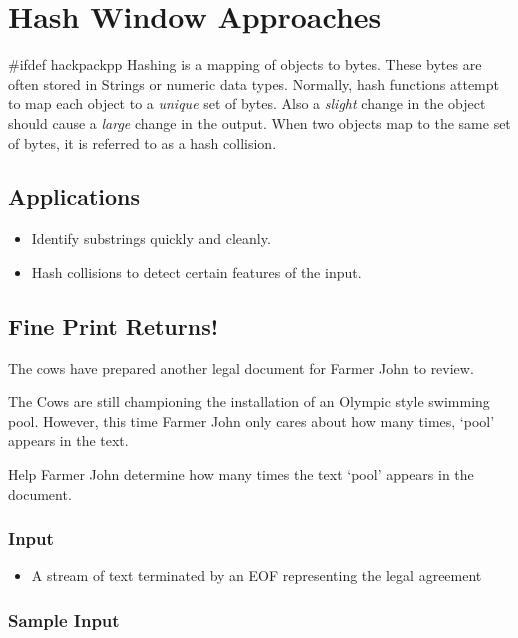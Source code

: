 \section{Hash Window Approaches}
#ifdef hackpackpp
Hashing is a mapping of objects to bytes.
These bytes are often stored in Strings or numeric data types.
Normally, hash functions attempt to map each object to a \textit{unique} set of bytes.
Also a \textit{slight} change in the object should cause a \textit{large} change in the output.
When two objects map to the same set of bytes, it is referred to as a hash collision.

\subsection{Applications}
\begin{itemize}
	\item Identify substrings quickly and cleanly.
	\item Hash collisions to detect certain features of the input.
\end{itemize}

\subsection{Fine Print Returns!}
The cows have prepared another legal document for Farmer John to review.

The Cows are still championing the installation of an Olympic style swimming pool.
However, this time Farmer John only cares about how many times, `pool' appears in the text.

Help Farmer John determine how many times the text `pool' appears in the document.

\subsubsection{Input}
\begin{itemize}
	\item A stream of text terminated by an EOF representing the legal agreement
\end{itemize}

\subsubsection{Sample Input}


